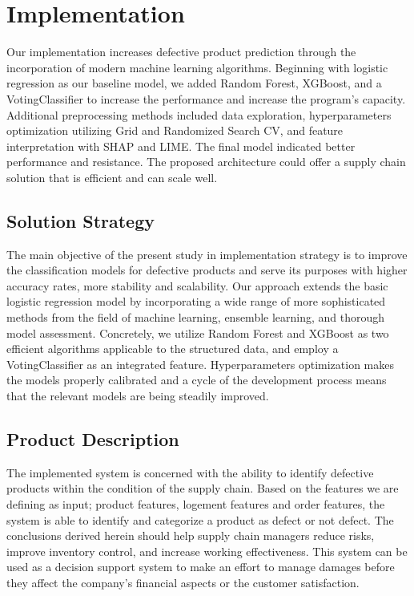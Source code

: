 \documentclass[conference]{IEEEtran}
\begin{document}
\section{Implementation}
Our implementation increases defective product prediction through the incorporation of modern machine learning algorithms. Beginning with logistic regression as our baseline model, we added Random Forest, XGBoost, and a VotingClassifier to increase the performance and increase the program’s capacity. Additional preprocessing methods included data exploration, hyperparameters optimization utilizing Grid and Randomized Search CV, and feature interpretation with SHAP and LIME. The final model indicated better performance and resistance. The proposed architecture could offer a supply chain solution that is efficient and can scale well.

\subsection{Solution Strategy}
The main objective of the present study in implementation strategy is to improve the classification models for defective products and serve its purposes with higher accuracy rates, more stability and scalability. Our approach extends the basic logistic regression model by incorporating a wide range of more sophisticated methods from the field of machine learning, ensemble learning, and thorough model assessment. Concretely, we utilize Random Forest and XGBoost as two efficient algorithms applicable to the structured data, and employ a VotingClassifier as an integrated feature. Hyperparameters optimization makes the models properly calibrated and a cycle of the development process means that the relevant models are being steadily improved.

\subsection{Product Description}
The implemented system is concerned with the ability to identify defective products within the condition of the supply chain. Based on the features we are defining as input; product features, logement features and order features, the system is able to identify and categorize a product as defect or not defect. The conclusions derived herein should help supply chain managers reduce risks, improve inventory control, and increase working effectiveness. This system can be used as a decision support system to make an effort to manage damages before they affect the company’s financial aspects or the customer satisfaction.
\end{document}

